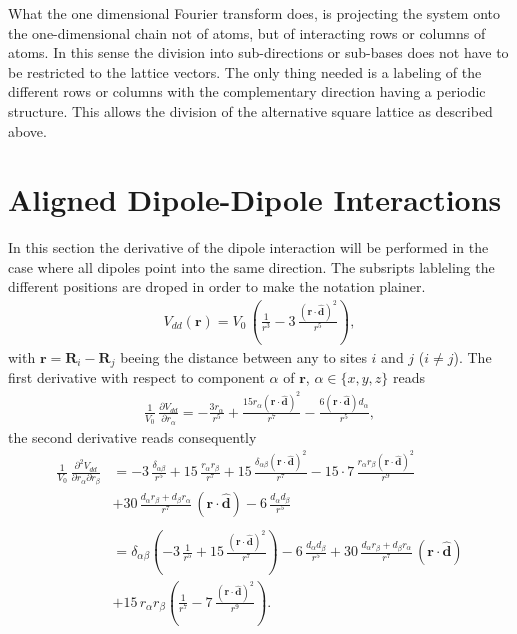 What the one dimensional Fourier transform does, is projecting the system onto the one-dimensional chain not of atoms, but of interacting rows or columns of atoms. In this sense the division into sub-directions or sub-bases does not have to be restricted to the lattice vectors. The only thing needed is a labeling of the different rows or columns with the complementary direction having a periodic structure. This allows the division of the alternative square lattice as described above.

\section*{Aligned Dipole-Dipole Interactions}

In this section the derivative of the dipole interaction will be performed in the case where all dipoles point into the same direction. The subsripts lableling the different positions are droped in order to make the notation plainer.
\begin{align}\label{eq:dipole_potential}
    V_{dd}(\mathbf{r}) = V_0\,\left(\frac{1}{r^3}-3\,\frac{(\mathbf{r}\cdot \hat{\mathbf{d}})^2}{r^5}\right),
\end{align}
with $\mathbf{r}=\mathbf{R}_i-\mathbf{R}_j$ beeing the distance between any to sites $i$ and $j$ ($i\neq j$). The first derivative with respect to component $\alpha$ of $\mathbf{r}$, $\alpha\in\{x,y,z\}$ reads
\begin{align*}
    \frac{1}{V_0}\,\frac{\partial V_{dd}}{\partial r_\alpha} = -\frac{3 r_\alpha}{r^5} + \frac{15 r_\alpha (\mathbf{r}\cdot \hat{\mathbf{d}})^2}{r^7} - \frac{6 (\mathbf{r}\cdot \hat{\mathbf{d}}) d_\alpha}{r^5},
\end{align*}
the second derivative reads consequently
\begin{align*}
    \frac{1}{V_0}\,\frac{\partial^2 V_{dd}}{\partial r_\alpha \partial r_\beta} &= -3\,\frac{\delta_{\alpha\beta}}{r^5} + 15\, \frac{r_\alpha r_\beta}{r^7} + 15 \,\frac{\delta_{\alpha\beta} (\mathbf{r}\cdot \hat{\mathbf{d}})^2}{r^7} - 15\cdot7\, \frac{r_\alpha r_\beta (\mathbf{r}\cdot \hat{\mathbf{d}})^2}{r^9} \\
    &+30\, \frac{d_\alpha r_\beta + d_\beta r_\alpha}{r^7}\,(\mathbf{r}\cdot \hat{\mathbf{d}}) - 6\, \frac{d_\alpha d_\beta}{r^5}\\\\
    &= \delta_{\alpha\beta}\left(-3\,\frac{1}{r^5} + 15\, \frac{(\mathbf{r}\cdot \hat{\mathbf{d}})^2}{r^7}\right)- 6\, \frac{d_\alpha d_\beta}{r^5} +30\, \frac{d_\alpha r_\beta + d_\beta r_\alpha}{r^7}\,(\mathbf{r}\cdot \hat{\mathbf{d}}) \\
    &+ 15\,r_\alpha r_\beta \left( \frac{1}{r^7} - 7\, \frac{(\mathbf{r}\cdot \hat{\mathbf{d}})^2}{r^9}\right).
\end{align*}


